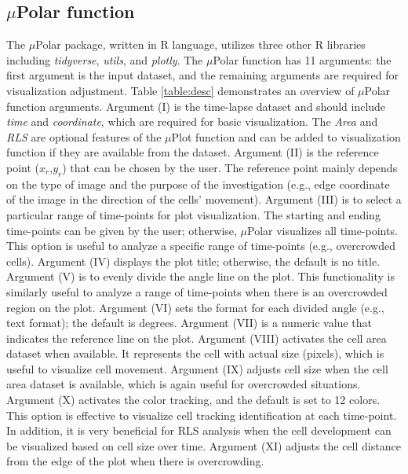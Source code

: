 \documentclass[conference]{IEEEtran}
\begin{document}
 
 
\subsection{$\mu$Polar function}
The $\mu$Polar package, written in R language, utilizes three other R libraries including \textit{tidyverse}, \textit{utils}, and \textit{plotly}. The $\mu$Polar function has 11 arguments: the first argument is the input dataset, and the remaining arguments are required for visualization adjustment. Table \ref{table:desc} demonstrates an overview of $\mu$Polar function arguments. Argument (I) is the time-lapse dataset and should include \textit{time} and \textit{coordinate}, which are required for basic visualization. The \textit{Area} and \textit{RLS} are optional features of the $\mu$Plot function and can be added to visualization function if they are available from the dataset. Argument (II) is the reference point ($x_r$,$y_r$) that can be chosen by the user. The reference point mainly depends on the type of image and the purpose of the investigation (e.g., edge coordinate of the image in the direction of the cells'
movement). Argument (III) is to select a particular range of time-points for plot visualization. The starting and ending time-points can be given by the user; otherwise, $\mu$Polar visualizes all time-points. This option is useful to analyze a specific range of time-points (e.g., overcrowded cells). Argument (IV) displays the plot title; otherwise, the default is no title. Argument (V) is to evenly divide the angle line on the plot. This functionality is similarly useful to analyze a range of time-points when there is an overcrowded region on the plot. Argument (VI) sets the format for each divided angle (e.g., text format); the default is degrees. Argument (VII) is a numeric value that indicates the reference line on the plot. Argument (VIII) activates the cell area dataset when available. It represents the cell with actual size (pixels), which is useful to visualize cell movement. Argument (IX) adjusts cell size when the cell area dataset is available, which is again useful for overcrowded situations. Argument (X) activates the color tracking, and the default is set to 12 colors. This option is effective to visualize cell tracking identification at each time-point. In addition, it is very beneficial for RLS analysis when the cell development can be visualized based on cell size over time. Argument (XI) adjusts the cell distance from the edge of the plot when there is overcrowding. 
\end{document}
